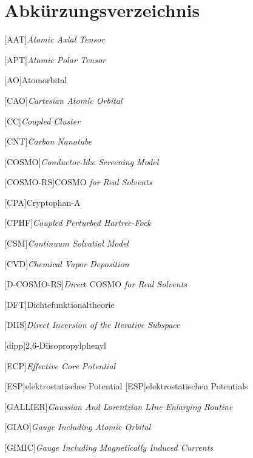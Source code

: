 \renewcommand\refname{Abkürzungsverzeichnis} \chapter{Abkürzungsverzeichnis}
\begin{acronym}[SEPSEP] %
    \setlength{\itemsep}{0.2cm} %
    
    [AAT]{\textit{Atomic Axial Tensor}}
    
    [APT]{\textit{Atomic Polar Tensor}}
    
    [AO]{Atomorbital}
	
	[CAO]{\textit{Cartesian Atomic Orbital}}
		
    [CC]{\textit{Coupled Cluster}}	
    
    [CNT]{\textit{Carbon Nanotube}}	
		
 	[COSMO]{\textit{Conductor-like Screening Model}}
 	
 	[COSMO-RS]{COSMO \textit{for Real Solvents}}

    [CPA]{Cryptophan-A} 	
 	
	[CPHF]{\textit{Coupled Perturbed Hartree-Fock}}
	
	[CSM]{\textit{Continuum Solvatiol Model}}
	
	[CVD]{\textit{Chemical Vapor Deposition}}
	
	[D-COSMO-RS]{\textit{Direc}t COSMO \textit{for Real Solvents}}
 	
    [DFT]{Dichtefunktionaltheorie}
    
    [DIIS]{\textit{Direct Inversion of the Iterative Subspace}}
    
    [dipp]{2,6-Diisopropylphenyl}
    
    [ECP]{\textit{Effective Core Potential}}
    
    [ESP]{elektrostatisches Potential}
	    [ESP]{elektrostatischen Potentials}

	[GALLIER]{\textit{Gaussian And Lorentzian LIne Enlarging Routine}}
	
	[GIAO]{\textit{Gauge Including Atomic Orbital}}   
	
	[GIMIC]{\textit{Gauge Including Magnetically Induced Currents}} 


\end{acronym}
